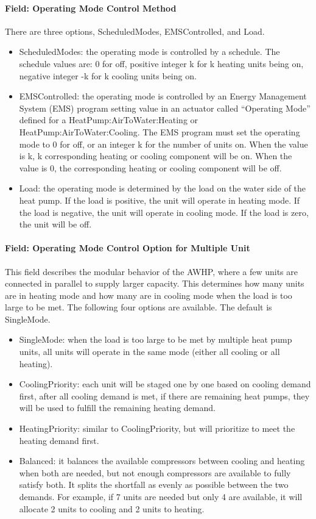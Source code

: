 \paragraph{Field: Operating Mode Control Method} There are three options,
ScheduledModes, EMSControlled, and Load.
\begin{itemize}
\item ScheduledModes: the operating mode is controlled by a schedule. The
schedule values are: 0 for off, positive integer k for k heating units being on,
negative integer -k for k cooling units being on.
\item EMSControlled: the operating mode is controlled by an Energy Management
System (EMS) program setting value in an actuator called ``Operating Mode''
defined for a HeatPump:AirToWater:Heating or HeatPump:AirToWater:Cooling. The
EMS program must set the operating mode to 0 for off, or an integer k for the
number of units on. When the value is k, k corresponding heating or cooling
component will be on. When the value is 0, the corresponding heating or cooling
component will be off.
\item Load: the operating mode is determined by the load on the water side of
the heat pump. If the load is positive, the unit will operate in heating mode.
If the load is negative, the unit will operate in cooling mode. If the load is
zero, the unit will be off.
\end{itemize}
\paragraph{Field: Operating Mode Control Option for Multiple Unit} 
This field describes the modular behavior of the AWHP, where a few units are
connected in parallel to supply larger capacity. This determines how many units
are in heating mode and how many are in cooling mode when the load is too large
to be met. The following four options are available. The default is SingleMode.
\begin{itemize}
    \item SingleMode: when the load is too large to be met by multiple heat pump
units, all units will operate in the same mode (either all cooling or all
heating).
    \item CoolingPriority: each unit will be staged one by one based on cooling
demand first, after all cooling demand is met, if there are remaining heat
pumps, they will be used to fulfill the remaining heating demand.
\item HeatingPriority: similar to CoolingPriority, but will prioritize to meet
  the heating demand first.
\item Balanced: it balances the available compressors between cooling and heating
  when both are needed, but not enough compressors are available to fully
  satisfy both. It splits the shortfall as evenly as possible between the two
  demands. For example, if 7 units are needed but only 4 are available, it will
  allocate 2 units to cooling and 2 units to heating.
\end{itemize}
